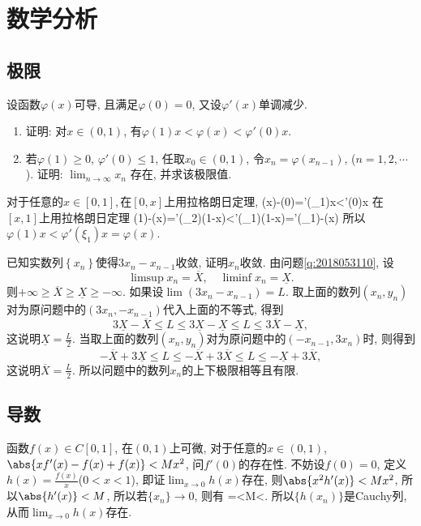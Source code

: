 \chapter{数学分析}
\section{极限}
\bq{}{}
设函数$\varphi(x)$可导, 且满足$\varphi(0)=0$, 又设$\varphi'(x)$单调减少. 
\begin{enumerate}
\item 证明: 对$x\in(0,1)$, 有$\varphi(1)x<\varphi(x)<\varphi'(0)x$.
\item 若$\varphi(1)\ge0$, $\varphi'(0)\le1$, 任取$x_{0}\in(0,1)$, 令$x_{n}=\varphi(x_{n-1})$,
($n=1,2,\cdots$). 证明: $\lim_{n\to\infty}x_{n}$ 存在, 并求该极限值.
\end{enumerate}
\eq
\ba
对于任意的$x\in[0,1],$在$[0,x]$上用拉格朗日定理,
\bee
\varphi(x)-\varphi(0)=\varphi'(\xi_{1})x<\varphi'(0)x
\eee
在$[x,1]$上用拉格朗日定理
\bee
\varphi(1)-\varphi(x)=\varphi'(\xi_{2})(1-x)<\varphi'(\xi_{1})(1-x)=\varphi'(\xi_{1})-\varphi(x)
\eee
所以$\varphi(1)x<\varphi'(\xi_{1})x=\varphi(x)$.
\ea

已知实数列$\left\{ x_{n}\right\} $使得$3x_{n}-x_{n-1}$收敛, 证明$x_{n}$收敛.
\eq
\ba
由问题\ref{q:2018053110}, 设
\[
\limsup x_{n}=\overline{X},\quad\liminf x_{n}=\underline{X}.
\]
则$+\infty\ge\overline{X}\ge\underline{X}\ge-\infty$. 如果设$\lim(3x_{n}-x_{n-1})=L$.
取上面的数列$\left(x_{n},y_{n}\right)$对为原问题中的$\left(3x_{n},-x_{n-1}\right)$代入上面的不等式,
得到
\[
3\underline{X}-\overline{X}\le L\le3\underline{X}-\underline{X}\le L\le3\overline{X}-\underline{X},
\]
这说明$\underline{X}=\frac{L}{2}$. 当取上面的数列$\left(x_{n},y_{n}\right)$对为原问题中的$\left(-x_{n-1},3x_{n}\right)$时,
则得到
\[
-\overline{X}+3\underline{X}\le L\le-\overline{X}+3\overline{X}\le L\le-\underline{X}+3\overline{X},
\]
这说明$\overline{X}=\frac{L}{2}$. 所以问题中的数列$x_{n}$的上下极限相等且有限. 
\ea

\section{导数}

\bq{}{}
函数$f(x)\in C[0,1]$, 在$(0,1)$上可微, 对于任意的$x\in(0,1)$, $\abs{xf'(x)-f(x)+f(x)}<Mx^2$, 问$f'(0)$的存在性.
\eq
\ba
不妨设$f(0)=0$, 定义$h(x)=\frac{f(x)}{x}$($0<x<1$), 即证$\lim_{x\to0}h(x)$存在, 则$\abs{x^2h'(x)}<Mx^2$,
所以$\abs{h'(x)}<M$, 所以若$\{x_n\}\to0$, 则有
\bee
{}=<M<\varepsilon.
\eee
所以$\{h(x_n)\}$是Cauchy列, 从而$\lim_{x\to0}h(x)$存在.
\ea

